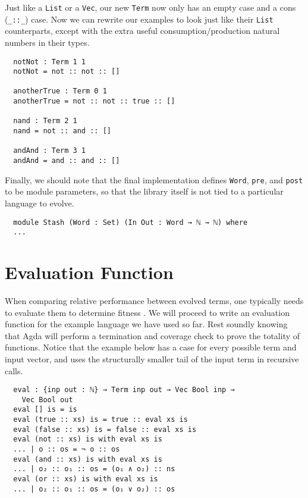 \documentclass[runningheads,a4paper]{llncs}
\begin{document}
Just like a \texttt{List} or a \texttt{Vec}, our new \texttt{Term} now
only has an empty case and a cons (\texttt{\_::\_}) case. Now we can
rewrite our examples to look just like their \texttt{List}
counterparts, except with the extra useful consumption/production
natural numbers in their types.

\begin{verbatim}
  notNot : Term 1 1
  notNot = not :: not :: []

  anotherTrue : Term 0 1
  anotherTrue = not :: not :: true :: []

  nand : Term 2 1
  nand = not :: and :: []

  andAnd : Term 3 1
  andAnd = and :: and :: []
\end{verbatim}

Finally, we should note that the final implementation defines
\texttt{Word}, \texttt{pre}, and \texttt{post} to be module
parameters, so that the library itself is not tied to a particular
language to evolve.

\begin{verbatim}
  module Stash (Word : Set) (In Out : Word → ℕ → ℕ) where
  ...
\end{verbatim}

\section{Evaluation Function}

When comparing relative performance between evolved terms, one
typically needs to evaluate them to determine fitness . We will
proceed to write an evaluation function for the example language we
have used so far. Rest soundly knowing that Agda will perform a termination and
coverage check to prove the totality of functions. Notice that the
example below has a case for every possible term and input vector, and
uses the structurally smaller tail of the input term in recursive
calls.

\begin{verbatim}
  eval : {inp out : ℕ} → Term inp out → Vec Bool inp →
    Vec Bool out
  eval [] is = is
  eval (true :: xs) is = true :: eval xs is
  eval (false :: xs) is = false :: eval xs is
  eval (not :: xs) is with eval xs is
  ... | o :: os = ¬ o :: os
  eval (and :: xs) is with eval xs is
  ... | o₂ :: o₁ :: os = (o₁ ∧ o₂) :: ns
  eval (or :: xs) is with eval xs is
  ... | o₂ :: o₁ :: os = (o₁ ∨ o₂) :: os
\end{verbatim}
\end{document}
